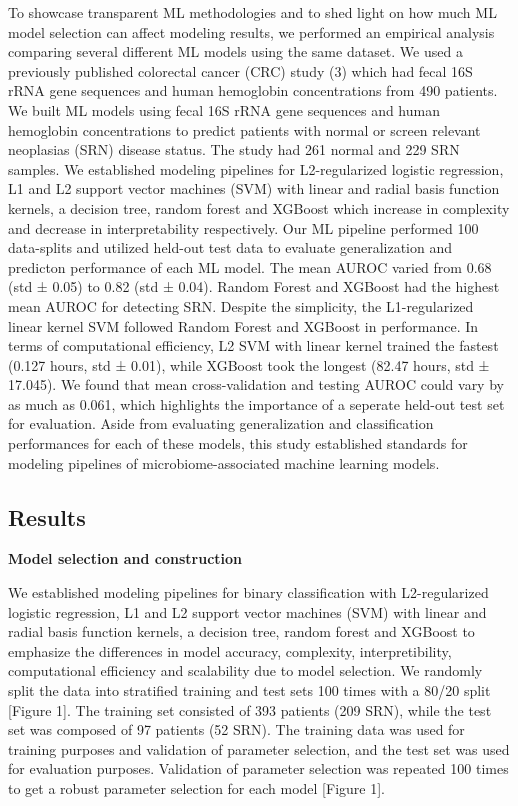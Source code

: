 \documentclass[11pt,]{article}
\begin{document}
To showcase transparent ML methodologies and to shed light on how much
ML model selection can affect modeling results, we performed an
empirical analysis comparing several different ML models using the same
dataset. We used a previously published colorectal cancer (CRC) study
(3) which had fecal 16S rRNA gene sequences and human hemoglobin
concentrations from 490 patients. We built ML models using fecal 16S
rRNA gene sequences and human hemoglobin concentrations to predict
patients with normal or screen relevant neoplasias (SRN) disease status.
The study had 261 normal and 229 SRN samples. We established modeling
pipelines for L2-regularized logistic regression, L1 and L2 support
vector machines (SVM) with linear and radial basis function kernels, a
decision tree, random forest and XGBoost which increase in complexity
and decrease in interpretability respectively. Our ML pipeline performed
100 data-splits and utilized held-out test data to evaluate
generalization and predicton performance of each ML model. The mean
AUROC varied from 0.68 (std ± 0.05) to 0.82 (std ± 0.04). Random Forest
and XGBoost had the highest mean AUROC for detecting SRN. Despite the
simplicity, the L1-regularized linear kernel SVM followed Random Forest
and XGBoost in performance. In terms of computational efficiency, L2 SVM
with linear kernel trained the fastest (0.127 hours, std ± 0.01), while
XGBoost took the longest (82.47 hours, std ± 17.045). We found that mean
cross-validation and testing AUROC could vary by as much as 0.061, which
highlights the importance of a seperate held-out test set for
evaluation. Aside from evaluating generalization and classification
performances for each of these models, this study established standards
for modeling pipelines of microbiome-associated machine learning models.

\subsection{Results}\label{results}

\textbf{Model selection and construction}

We established modeling pipelines for binary classification with
L2-regularized logistic regression, L1 and L2 support vector machines
(SVM) with linear and radial basis function kernels, a decision tree,
random forest and XGBoost to emphasize the differences in model
accuracy, complexity, interpretibility, computational efficiency and
scalability due to model selection. We randomly split the data into
stratified training and test sets 100 times with a 80/20 split {[}Figure
1{]}. The training set consisted of 393 patients (209 SRN), while the
test set was composed of 97 patients (52 SRN). The training data was
used for training purposes and validation of parameter selection, and
the test set was used for evaluation purposes. Validation of parameter
selection was repeated 100 times to get a robust parameter selection for
each model {[}Figure 1{]}.
\end{document}
